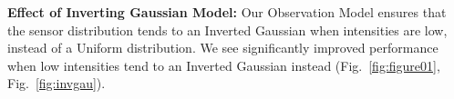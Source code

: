 
\textbf{Effect of Inverting Gaussian Model:} Our Observation Model ensures that the sensor distribution tends to an Inverted Gaussian when intensities are low, instead of a Uniform distribution. We see significantly improved performance when low intensities tend to an Inverted Gaussian instead (Fig.~\ref{fig:figure01}, Fig.~\ref{fig:invgau}).

